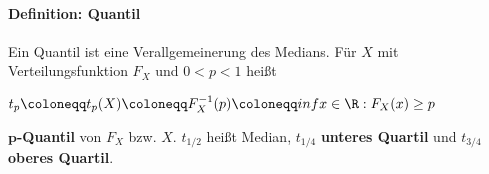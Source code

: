 \paragraph{Definition: Quantil}
Ein Quantil ist eine Verallgemeinerung des Medians.
Für $X$ mit Verteilungsfunktion $F_X$ und $0<p<1$ heißt
\begin{tightcenter}
	$t_p\coloneqq t_p(X)\coloneqq F_{X}^{-1}(p)\coloneqq inf{x\in\R:F_X(x)\geq p}$
\end{tightcenter}
$\boldsymbol{p}$\textbf{-Quantil} von $F_X$ bzw. $X$. 
$t_{1/2}$ heißt Median, $t_{1/4}$ \textbf{unteres Quartil} und $t_{3/4}$ \textbf{oberes Quartil}.